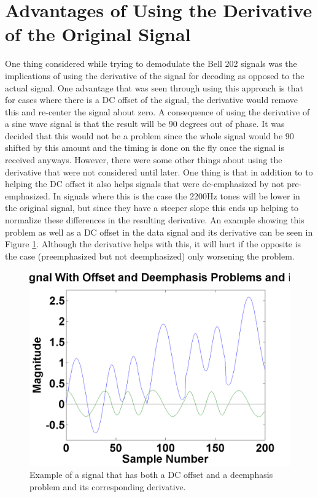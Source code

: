 \section{Advantages of Using the Derivative of the Original Signal}
One thing considered while trying to demodulate the Bell 202 signals was the implications of using the derivative of the signal for decoding as opposed to the actual signal. One advantage that was seen through using this approach is that for cases where there is a DC offset of the signal, the derivative would remove this and re-center the signal about zero. A consequence of using the derivative of a sine wave signal is that the result will be 90 degrees out of phase. It was decided that this would not be a problem since the whole signal would be 90 shifted by this amount and the timing is done on the fly once the signal is received anyways. However, there were some other things about using the derivative that were not considered until later. One thing is that in addition to to helping the DC offset it also helps signals that were de-emphasized by not pre-emphasized. In signals where this is the case the 2200Hz tones will be lower in the original signal, but since they have a steeper slope this ends up helping to normalize these differences in the resulting derivative. An example showing this problem as well as a DC offset in the data signal and its derivative can be seen in Figure \ref{emphasisAndDerivativeExample}. Although the derivative helps with this, it will hurt if the opposite is the case (preemphasized but not deemphasized) only worsening the problem.
\begin{figure}
  \centering
	\includegraphics[width=0.75\linewidth]{images/OriginalSignalWithOffsetandDeemphasisProblemsanditsDerivative.png} 
	\caption{Example of a signal that has both a DC offset and a deemphasis problem and its corresponding derivative.}
   \label{emphasisAndDerivativeExample}
\end{figure}
